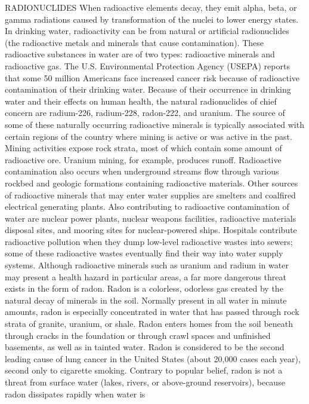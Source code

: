 \documentclass{article}
\begin{document}
RADIONUCLIDES When radioactive elements decay, they emit alpha, beta, or
gamma radiations caused by transformation of the nuclei to lower energy
states. In drinking water, radioactivity can be from natural or
artificial radionuclides (the radioactive metals and minerals that cause
contamination). These radioactive substances in water are of two types:
radioactive minerals and radioactive gas. The U.S. Environmental
Protection Agency (USEPA) reports that some 50 million Americans face
increased cancer risk because of radioactive contamination of their
drinking water. Because of their occurrence in drinking water and their
effects on human health, the natural radionuclides of chief concern are
radium-226, radium-228, radon-222, and uranium. The source of some of
these naturally occurring radioactive minerals is typically associated
with certain regions of the country where mining is active or was active
in the past. Mining activities expose rock strata, most of which contain
some amount of radioactive ore. Uranium mining, for example, produces
runoff. Radioactive contamination also occurs when underground streams
flow through various rockbed and geologic formations containing
radioactive materials. Other sources of radioactive minerals that may
enter water supplies are smelters and coalfired electrical generating
plants. Also contributing to radioactive contamination of water are
nuclear power plants, nuclear weapons facilities, radioactive materials
disposal sites, and mooring sites for nuclear-powered ships. Hospitals
contribute radioactive pollution when they dump low-level radioactive
wastes into sewers; some of these radioactive wastes eventually find
their way into water supply systems. Although radioactive minerals such
as uranium and radium in water may present a health hazard in particular
areas, a far more dangerous threat exists in the form of radon. Radon is
a colorless, odorless gas created by the natural decay of minerals in
the soil. Normally present in all water in minute amounts, radon is
especially concentrated in water that has passed through rock strata of
granite, uranium, or shale. Radon enters homes from the soil beneath
through cracks in the foundation or through crawl spaces and unfinished
basements, as well as in tainted water. Radon is considered to be the
second leading cause of lung cancer in the United States (about 20,000
cases each year), second only to cigarette smoking. Contrary to popular
belief, radon is not a threat from surface water (lakes, rivers, or
above-ground reservoirs), because radon dissipates rapidly when water is
\end{document}
